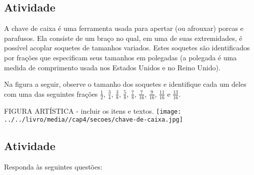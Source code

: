 \documentclass[a4,12pt]{book}
\begin{document}
\subsection{Atividade}







A chave de caixa é uma ferramenta usada para apertar (ou afrouxar) porcas e parafusos. Ela consiste 
de um braço no qual, em uma de suas extremidades, é possível acoplar soquetes de tamanhos variados.
Estes soquetes são identificados por frações que especificam seus tamanhos em polegadas (a polegada é uma medida de comprimento usada nos Estados Unidos e no Reino Unido).

Na figura a seguir, observe o tamanho dos soquetes e identifique cada um deles com uma das seguintes frações $\frac{1}{2}$, $\frac{3}{4}$, $\frac{3}{8}$, $\frac{5}{8}$, $\frac{7}{8}$, $\frac{7}{16}$, $\frac{9}{16}$, $\frac{11}{16}$ e $\frac{13}{16}$.
\begin{imagem*}[breakable]{}{}   FIGURA ARTÍSTICA - incluir os itens e textos.  
    \texttt{[image: ../../livro/media//cap4/secoes/chave-de-caixa.jpg]}  
\end{imagem*}





\subsection{Atividade}







Responda às seguintes questões: 
\end{document}
